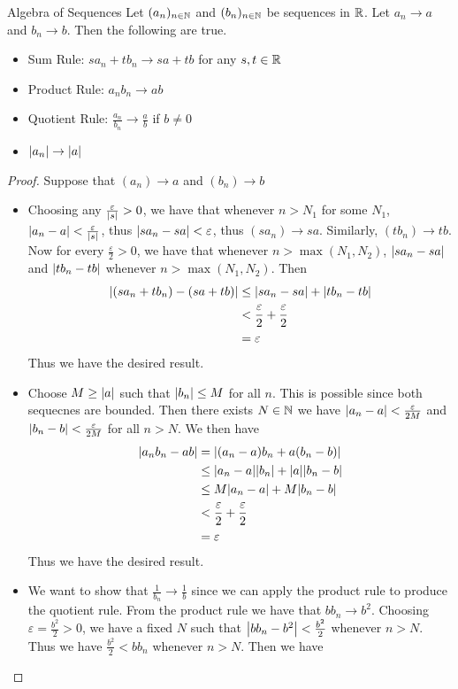 \documentclass[a4paper]{article}
\begin{document}
\begin{prp}{Algebra of Sequences}{} Let $(a_n)_{n\in\mathbb{N}}$ and $(b_n)_{n\in\mathbb{N}}$ be sequences in $\mathbb{R}$. Let $a_n\to a$ and $b_n\to b$. Then the following are true. 
\begin{itemize}
\item Sum Rule: $sa_n+tb_n\to sa+tb$ for any $s,t\in\mathbb{R}$
\item Product Rule: $a_nb_n\to ab$
\item Quotient Rule: $\frac{a_n}{b_n}\to\frac{a}{b}$ if $b\neq 0$
\item $\abs{a_n}\to\abs{a}$
\end{itemize}\tcbline
\begin{proof} Suppose that $(a_n)\to a$ and $(b_n)\to b$
\begin{itemize}
\item Choosing any $\frac{\varepsilon}{\abs{s}}>0$, we have that whenever $n>N_1$ for some $N_1$, $\abs{a_n-a}<\frac{\varepsilon}{\abs{s}}$, thus $\abs{sa_n-sa}<\varepsilon$, thus $(sa_n)\to sa$. Similarly, $(tb_n)\to tb$. Now for every $\frac{\varepsilon}{2}>0$, we have that whenever $n>\max{(N_1,N_2)}$, $\abs{sa_n-sa}$ and $\abs{tb_n-tb}$ whenever $n>\max{(N_1,N_2)}$. Then 
\begin{align*}
\abs{(sa_n+tb_n)-(sa+tb)}&\leq\abs{sa_n-sa}+\abs{tb_n-tb} \\
&<\frac{\varepsilon}{2}+\frac{\varepsilon}{2} \\
&=\varepsilon
\end{align*}
Thus we have the desired result. 
\item Choose $M\geq\abs{a}$ such that $\abs{b_n}\leq M$ for all $n$. This is possible since both sequecnes are bounded. Then there exists $N\in\mathbb{N}$ we have $\abs{a_n-a}<\frac{\varepsilon}{2M}$ and $\abs{b_n-b}<\frac{\varepsilon}{2M}$ for all $n>N$. We then have
\begin{align*}
\abs{a_nb_n-ab}&=\abs{(a_n-a)b_n+a(b_n-b)} \\
&\leq\abs{a_n-a}\abs{b_n}+\abs{a}\abs{b_n-b} \\
&\leq M\abs{a_n-a}+M\abs{b_n-b} \\
&<\frac{\varepsilon}{2}+\frac{\varepsilon}{2} \\
&=\varepsilon
\end{align*}
Thus we have the desired result. 
\item We want to show that $\frac{1}{b_n}\to\frac{1}{b}$ since we can apply the product rule to produce the quotient rule. From the product rule we have that $bb_n\to b^2$. Choosing $\varepsilon=\frac{b^2}{2}>0$, we have a fixed $N$ such that $\abs{bb_n-b^2}<\frac{b^2}{2}$ whenever $n>N$. Thus we have $\frac{b^2}{2}<bb_n$ whenever $n>N$. Then we have

\end{itemize}
\end{proof}
\end{prp}
\end{document}
